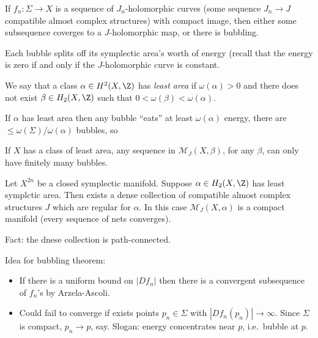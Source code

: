 \documentclass[a4paper]{article}
\begin{document}
\begin{theorem}
  If \(f_n: \Sigma \to X\) is a sequence of \(J_n\)-holomorphic curves (some sequence \(J_n \to J\) compatible almost complex structures) with compact image, then either some subsequence coverges to a \(J\)-holomorphic map, or there is bubbling.
\end{theorem}

\begin{note}
  Each bubble splits off its symplectic area's worth of energy (recall that the energy is zero if and only if the \(J\)-holomorphic curve is constant.
\end{note}

\begin{definition}
  We say that a class \(\alpha \in H^2(X, \Z)\) has \emph{least area} if \(\omega(\alpha) > 0\) and there does not exist \(\beta \in H_2(X, \Z)\) such that \(0 < \omega(\beta) < \omega(\alpha)\).
\end{definition}

If \(\alpha\) has least area then any bubble ``eats'' at least \(\omega(\alpha)\) energy, there are \(\leq \omega(\Sigma)/\omega(\alpha)\) bubbles, so

\begin{corollary}
  If \(X\) has a class of least area, any sequence in \(\mathcal M_J(X, \beta)\), for any \(\beta\), can only have finitely many bubbles.
\end{corollary}

\begin{theorem}
  Let \(X^{2n}\) be a closed symplectic manifold. Suppose \(\alpha \in H_2(X, \Z)\) has least symplctic area. Then exists a dense collection of compatible almost complex structures \(J\) which are regular for \(\alpha\). In this case \(\mathcal M_J(X, \alpha)\) is a compact manifold (every sequence of nets converges).
\end{theorem}

Fact: the dnese collection is path-connected.

Idea for bubbling theorem:

\begin{itemize}
\item If there is a uniform bound on \(|Df_n|\) then there is a convergent subsequence of \(f_n\)'s by Arzela-Ascoli.
\item Could fail to converge if exists points \(p_n \in \Sigma\) with \(|Df_n(p_n)| \to \infty\). Since \(\Sigma\) is compact, \(p_n \to p\), say. Slogan: energy concentrates near \(p\), i.e.\ bubble at \(p\).
\end{itemize}
\end{document}
